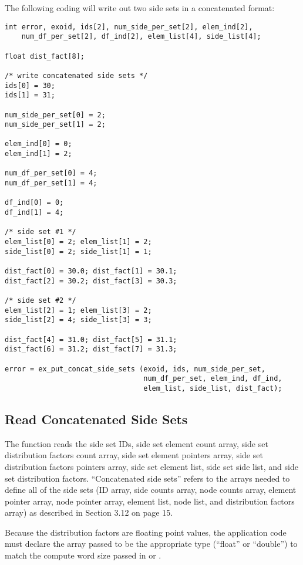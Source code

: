 The following coding will write out two side sets in a concatenated 
format:
\begin{lstlisting}
int error, exoid, ids[2], num_side_per_set[2], elem_ind[2],
    num_df_per_set[2], df_ind[2], elem_list[4], side_list[4];

float dist_fact[8];

/* write concatenated side sets */
ids[0] = 30;
ids[1] = 31;

num_side_per_set[0] = 2;
num_side_per_set[1] = 2;

elem_ind[0] = 0;
elem_ind[1] = 2;

num_df_per_set[0] = 4;
num_df_per_set[1] = 4;

df_ind[0] = 0;
df_ind[1] = 4;

/* side set #1 */
elem_list[0] = 2; elem_list[1] = 2;
side_list[0] = 2; side_list[1] = 1;

dist_fact[0] = 30.0; dist_fact[1] = 30.1;
dist_fact[2] = 30.2; dist_fact[3] = 30.3;

/* side set #2 */
elem_list[2] = 1; elem_list[3] = 2;
side_list[2] = 4; side_list[3] = 3;

dist_fact[4] = 31.0; dist_fact[5] = 31.1;
dist_fact[6] = 31.2; dist_fact[7] = 31.3;

error = ex_put_concat_side_sets (exoid, ids, num_side_per_set,
                                 num_df_per_set, elem_ind, df_ind, 
                                 elem_list, side_list, dist_fact);
\end{lstlisting}


\subsection{Read Concatenated Side Sets}

The function  reads the side set
IDs, side set element count array, side set distribution factors count
array, side set element pointers array, side set distribution factors
pointers array, side set element list, side set side list, and side
set distribution factors. ``Concatenated side sets'' refers to the
arrays needed to define all of the side sets (ID array, side counts
array, node counts array, element pointer array, node pointer array,
element list, node list, and distribution factors array) as described
in Section 3.12 on page 15.


Because the distribution factors are floating point values, the
application code must declare the array passed to be the appropriate
type (``float'' or ``double'') to match the compute word size passed
in  or .


